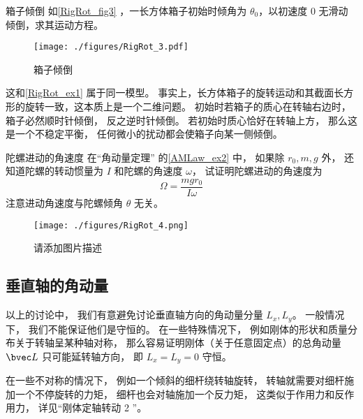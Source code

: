 \begin{example}{箱子倾倒}
如\autoref{RigRot_fig3} ，一长方体箱子初始时倾角为 $\theta_0$，以初速度 0 无滑动倾倒，求其运动方程。
\begin{figure}[ht]
\centering
\texttt{[image: ./figures/RigRot\_3.pdf]}
\caption{箱子倾倒} \label{RigRot_fig3}
\end{figure}
这和\autoref{RigRot_ex1} 属于同一模型。 事实上，长方体箱子的旋转运动和其截面长方形的旋转一致，这本质上是一个二维问题。 初始时若箱子的质心在转轴右边时， 箱子必然顺时针倾倒， 反之逆时针倾倒。 若初始时质心恰好在转轴上方， 那么这是一个不稳定平衡， 任何微小的扰动都会使箱子向某一侧倾倒。
\end{example}

\begin{exercise}{陀螺进动的角速度}\label{RigRot_exe1}
在“角动量定理” 的\autoref{AMLaw_ex2} 中， 如果除 $r_0, m, g$ 外， 还知道陀螺的转动惯量为 $I$ 和陀螺的角速度 $\omega$， 试证明陀螺进动的角速度为
\begin{equation}
\Omega = \frac{mgr_0}{I\omega}
\end{equation}
注意进动角速度与陀螺倾角 $\theta$ 无关。
\end{exercise}

\begin{example}{}\label{RigRot_ex2}
\begin{figure}[ht]
\centering
\texttt{[image: ./figures/RigRot\_4.png]}
\caption{请添加图片描述} \label{RigRot_fig4}
\end{figure}
\end{example}

\subsection{垂直轴的角动量}
以上的讨论中， 我们有意避免讨论垂直轴方向的角动量分量 $L_x, L_y$。 一般情况下， 我们不能保证他们是守恒的。 在一些特殊情况下， 例如刚体的形状和质量分布关于转轴呈某种轴对称， 那么容易证明刚体（关于任意固定点）的总角动量 $\bvec L$ 只可能延转轴方向， 即 $L_x = L_y = 0$ 守恒。 %

在一些不对称的情况下， 例如一个倾斜的细杆绕转轴旋转， %
转轴就需要对细杆施加一个不停旋转的力矩， 细杆也会对轴施加一个反力矩， 这类似于作用力和反作用力， 详见“刚体定轴转动 2 ”。
